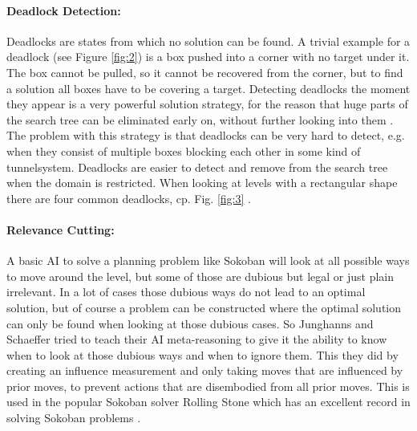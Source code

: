 \documentclass[12pt,a4paper,oneside]{report}
\begin{document}
\paragraph{Deadlock Detection:} Deadlocks are states from which no solution can be found. A trivial example for a deadlock (see Figure \ref{fig:2}) is a box pushed into a corner with no target under it. The box cannot be pulled, so it cannot be recovered from the corner, but to find a solution all boxes have to be covering a target.
Detecting deadlocks the moment they appear is a very powerful solution strategy, for the reason that huge parts of the search tree can be eliminated early on, without further looking into them \cite{SokoRelevanceCuts}. The problem with this strategy is that deadlocks can be very hard to detect, e.g. when they consist of multiple boxes blocking each other in some kind of tunnelsystem. Deadlocks are easier to detect and remove from the search tree when the domain is restricted. When looking at levels with a rectangular shape there are four common deadlocks, cp. Fig. \ref{fig:3} .
\paragraph{Relevance Cutting:} A basic AI to solve a planning problem like Sokoban will look at all possible ways to move around the level, but some of those are dubious but legal or just plain irrelevant. In a lot of cases those dubious ways do not lead to an optimal solution, but of course a problem can be constructed where the optimal solution can only be found when looking at those dubious cases. So Junghanns and Schaeffer tried to teach their AI meta-reasoning to give it the ability to know when to look at those dubious ways and when to ignore them. This they did by creating an influence measurement and only taking moves that are influenced by prior moves, to prevent actions that are disembodied from all prior moves. This is used in the popular Sokoban solver Rolling Stone which has an excellent record in solving Sokoban problems \cite{SokoRelevanceCuts}.
\end{document}
